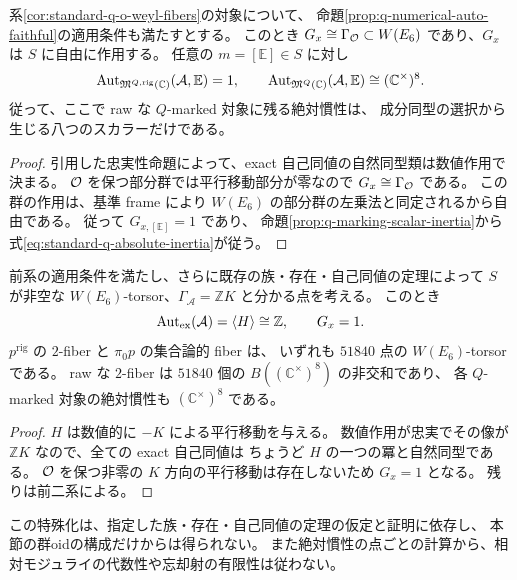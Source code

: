 \begin{corollary}[標準型の自己同値作用と絶対慣性]
\label{cor:standard-q-absolute-inertia}
系\ref{cor:standard-q-o-weyl-fibers}の対象について、
命題\ref{prop:q-numerical-auto-faithful}の適用条件も満たすとする。
このとき $G_x\cong\Gamma_{\mathcal O}\subset W(E_6)$ であり、$G_x$ は $S$ に自由に作用する。
任意の $m=[\mathbb E]\in S$ に対し
\begin{equation}\label{eq:standard-q-absolute-inertia}
 \operatorname{Aut}_{\mathfrak M^{Q,\mathrm{rig}}(\mathbb C)}(\mathcal A,\mathbb E)=1,
 \qquad
 \operatorname{Aut}_{\mathfrak M^Q(\mathbb C)}(\mathcal A,\mathbb E)
   \cong(\mathbb C^\times)^8.
\end{equation}
従って、ここで raw な $Q$-marked 対象に残る絶対慣性は、
成分同型の選択から生じる八つのスカラーだけである。
\end{corollary}
\begin{proof}
引用した忠実性命題によって、exact 自己同値の自然同型類は数値作用で決まる。
$\mathcal O$ を保つ部分群では平行移動部分が零なので $G_x\cong\Gamma_{\mathcal O}$ である。
この群の作用は、基準 frame により $W(E_6)$ の部分群の左乗法と同定されるから自由である。
従って $G_{x,[\mathbb E]}=1$ であり、
命題\ref{prop:q-marking-scalar-inertia}から式\eqref{eq:standard-q-absolute-inertia}が従う。
\end{proof}

\begin{corollary}[非常に一般の標準点への特殊化]
\label{cor:very-general-q-o-groupoids}
前系の適用条件を満たし、さらに既存の族・存在・自己同値の定理によって
$S$ が非空な $W(E_6)$-torsor、$\Gamma_{\mathcal A}=\mathbb ZK$ と分かる点を考える。
このとき
\[
 \operatorname{Aut}_{\rm ex}(\mathcal A)=\langle H\rangle\cong\mathbb Z,
 \qquad G_x=1.
\]
$p^{\mathrm{rig}}$ の $2$-fiber と $\pi_0p$ の集合論的 fiber は、
いずれも $51840$ 点の $W(E_6)$-torsor である。
raw な $2$-fiber は $51840$ 個の $B((\mathbb C^\times)^8)$ の非交和であり、
各 $Q$-marked 対象の絶対慣性も $(\mathbb C^\times)^8$ である。
\end{corollary}
\begin{proof}
$H$ は数値的に $-K$ による平行移動を与える。
数値作用が忠実でその像が $\mathbb ZK$ なので、全ての exact 自己同値は
ちょうど $H$ の一つの冪と自然同型である。
$\mathcal O$ を保つ非零の $K$ 方向の平行移動は存在しないため $G_x=1$ となる。
残りは前二系による。
\end{proof}
この特殊化は、指定した族・存在・自己同値の定理の仮定と証明に依存し、
本節の群oidの構成だけからは得られない。
また絶対慣性の点ごとの計算から、相対モジュライの代数性や忘却射の有限性は従わない。


